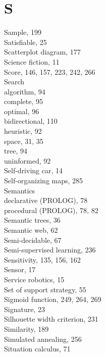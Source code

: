\documentclass[10pt]{article}
\begin{document}
\section*{S}
Sample, 199\\
Satisfiable, 25\\
Scatterplot diagram, 177\\
Science fiction, 11\\
Score, 146, 157, 223, 242, 266\\
Search\\
algorithm, 94\\
complete, 95\\
optimal, 96\\
bidirectional, 110\\
heuristic, 92\\
space, 31, 35\\
tree, 94\\
uninformed, 92\\
Self-driving car, 14\\
Self-organizing maps, 285\\
Semantics\\
declarative (PROLOG), 78\\
procedural (PROLOG), 78, 82\\
Semantic trees, 36\\
Semantic web, 62\\
Semi-decidable, 67\\
Semi-supervised learning, 236\\
Sensitivity, 135, 156, 162\\
Sensor, 17\\
Service robotics, 15\\
Set of support strategy, 55\\
Sigmoid function, 249, 264, 269\\
Signature, 23\\
Silhouette width criterion, 231\\
Similarity, 189\\
Simulated annealing, 256\\
Situation calculus, 71
\end{document}
